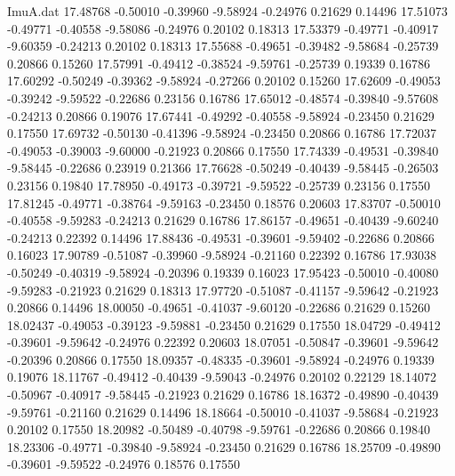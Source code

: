 \begin{filecontents}{ImuA.dat}
  17.48768   -0.50010   -0.39960   -9.58924   -0.24976    0.21629    0.14496
  17.51073   -0.49771   -0.40558   -9.58086   -0.24976    0.20102    0.18313
  17.53379   -0.49771   -0.40917   -9.60359   -0.24213    0.20102    0.18313
  17.55688   -0.49651   -0.39482   -9.58684   -0.25739    0.20866    0.15260
  17.57991   -0.49412   -0.38524   -9.59761   -0.25739    0.19339    0.16786
  17.60292   -0.50249   -0.39362   -9.58924   -0.27266    0.20102    0.15260
  17.62609   -0.49053   -0.39242   -9.59522   -0.22686    0.23156    0.16786
  17.65012   -0.48574   -0.39840   -9.57608   -0.24213    0.20866    0.19076
  17.67441   -0.49292   -0.40558   -9.58924   -0.23450    0.21629    0.17550
  17.69732   -0.50130   -0.41396   -9.58924   -0.23450    0.20866    0.16786
  17.72037   -0.49053   -0.39003   -9.60000   -0.21923    0.20866    0.17550
  17.74339   -0.49531   -0.39840   -9.58445   -0.22686    0.23919    0.21366
  17.76628   -0.50249   -0.40439   -9.58445   -0.26503    0.23156    0.19840
  17.78950   -0.49173   -0.39721   -9.59522   -0.25739    0.23156    0.17550
  17.81245   -0.49771   -0.38764   -9.59163   -0.23450    0.18576    0.20603
  17.83707   -0.50010   -0.40558   -9.59283   -0.24213    0.21629    0.16786
  17.86157   -0.49651   -0.40439   -9.60240   -0.24213    0.22392    0.14496
  17.88436   -0.49531   -0.39601   -9.59402   -0.22686    0.20866    0.16023
  17.90789   -0.51087   -0.39960   -9.58924   -0.21160    0.22392    0.16786
  17.93038   -0.50249   -0.40319   -9.58924   -0.20396    0.19339    0.16023
  17.95423   -0.50010   -0.40080   -9.59283   -0.21923    0.21629    0.18313
  17.97720   -0.51087   -0.41157   -9.59642   -0.21923    0.20866    0.14496
  18.00050   -0.49651   -0.41037   -9.60120   -0.22686    0.21629    0.15260
  18.02437   -0.49053   -0.39123   -9.59881   -0.23450    0.21629    0.17550
  18.04729   -0.49412   -0.39601   -9.59642   -0.24976    0.22392    0.20603
  18.07051   -0.50847   -0.39601   -9.59642   -0.20396    0.20866    0.17550
  18.09357   -0.48335   -0.39601   -9.58924   -0.24976    0.19339    0.19076
  18.11767   -0.49412   -0.40439   -9.59043   -0.24976    0.20102    0.22129
  18.14072   -0.50967   -0.40917   -9.58445   -0.21923    0.21629    0.16786
  18.16372   -0.49890   -0.40439   -9.59761   -0.21160    0.21629    0.14496
  18.18664   -0.50010   -0.41037   -9.58684   -0.21923    0.20102    0.17550
  18.20982   -0.50489   -0.40798   -9.59761   -0.22686    0.20866    0.19840
  18.23306   -0.49771   -0.39840   -9.58924   -0.23450    0.21629    0.16786
  18.25709   -0.49890   -0.39601   -9.59522   -0.24976    0.18576    0.17550

\end{filecontents}
